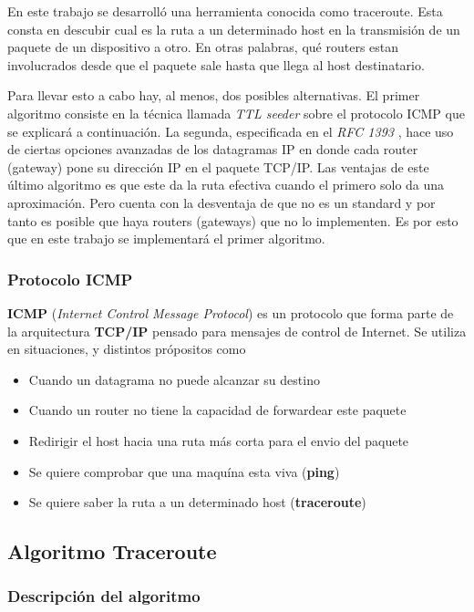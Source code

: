 En este trabajo se desarrolló una herramienta conocida como traceroute. Esta
consta en descubir cual es la ruta a un determinado host en la transmisión 
de un paquete de un dispositivo a otro. En otras palabras, qué routers estan
involucrados desde que el paquete sale hasta que llega al host destinatario.

Para llevar esto a cabo hay, al menos, dos posibles alternativas. El primer
algoritmo consiste en la técnica llamada \emph{TTL seeder} sobre el protocolo
ICMP que se explicará a continuación. La segunda, especificada en el \emph{RFC
1393} \cite{rfc1393}, hace uso de ciertas opciones avanzadas de los datagramas IP en donde
cada router (gateway) pone su dirección IP en el paquete TCP/IP. Las ventajas
de este último algoritmo es que este da la ruta efectiva
cuando el primero solo da una aproximación. Pero cuenta con la desventaja de que no es un standard
y por tanto es posible que haya routers (gateways) que no lo
implementen. Es por esto que en este trabajo se implementará el primer
algoritmo.

\subsubsection{Protocolo \textbf{ICMP}}

\textbf{ICMP}\cite{rfc792} (\emph{Internet Control Message Protocol}) es un protocolo que
forma parte de la arquitectura \textbf{TCP/IP} pensado para mensajes de control
de Internet. Se utiliza en situaciones, y distintos própositos como

\begin{itemize}
	\item Cuando un datagrama no puede alcanzar su destino
	\item Cuando un router no tiene la capacidad de forwardear este paquete
	\item Redirigir el host hacia una ruta más corta para el envio del paquete
	\item Se quiere comprobar que una maquína esta viva (\textbf{ping})
	\item Se quiere saber la ruta a un determinado host (\textbf{traceroute})
\end{itemize}

\subsection{Algoritmo Traceroute}

\subsubsection{Descripción del algoritmo}

